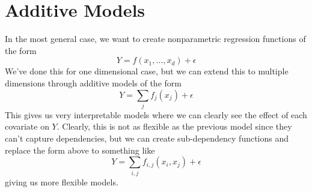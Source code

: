 \section{Additive Models}

  In the most general case, we want to create nonparametric regression functions of the form 
  \begin{equation}
    Y = f(x_1, \ldots, x_d) + \epsilon 
  \end{equation}
  We've done this for one dimensional case, but we can extend this to multiple dimensions through additive models of the form 
  \begin{equation}
    Y = \sum_j f_j (x_j)  + \epsilon
  \end{equation}
  This gives us very interpretable models where we can clearly see the effect of each covariate on $Y$. Clearly, this is not as flexible as the previous model since they can't capture dependencies, but we can create sub-dependency functions and replace the form above to something like 
  \begin{equation}
    Y = \sum_{i, j} f_{i, j} (x_i, x_j) + \epsilon
  \end{equation}
  giving us more flexible models. 

